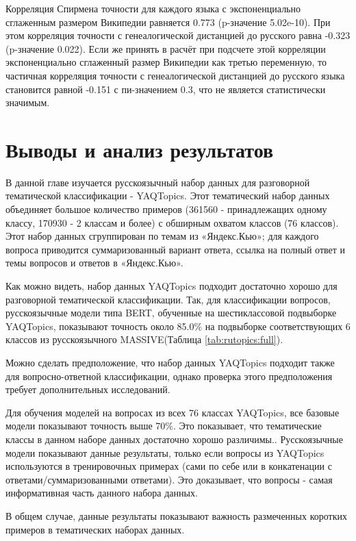 Корреляция Спирмена точности для каждого языка с экспоненциально сглаженным размером Википедии равняется 0.773 (p-значение 5.02e-10). При этом корреляция точности с генеалогической дистанцией до русского равна -0.323 (p-значение 0.022). Если же принять в расчёт при подсчете этой корреляции экспоненциально сглаженный размер Википедии как третью переменную, то частичная корреляция точности с генеалогической дистанцией до русского языка становится равной -0.151 с пи-значением 0.3, что не является статистически значимым.


\section{Выводы и анализ результатов} 

В данной главе изучается русскоязычный набор данных для разговорной тематической классификации - {YAQTopics}. Этот тематический набор данных объединяет большое количество примеров (361560 - принадлежащих одному классу, 170930 - 2 классам и более) с обширным охватом классов (76 классов). Этот набор данных сгруппирован по темам из «Яндекс.Кью»; для каждого вопроса приводится суммаризованный вариант ответа, ссылка на полный ответ и темы вопросов и ответов в «Яндекс.Кью».

Как можно видеть, набор данных {YAQTopics} подходит достаточно хорошо для разговорной тематической классификации. Так, для классификации вопросов, русскоязычные модели типа BERT, обученные на шестиклассовой подвыборке {YAQTopics}, показывают точность около 85.0\% на подвыборке соответствующих 6 классов из русскоязычного {MASSIVE}(Таблица \ref{tab:rutopics:full}).

Можно сделать предположение, что набор данных {YAQTopics} подходит также для вопросно-ответной классификации, однако проверка этого предположения требует дополнительных исследований.

Для обучения моделей на вопросах из всех 76 классах {YAQTopics}, все базовые модели показывают точность выше 70\%. Это показывает, что тематические классы в данном наборе данных достаточно хорошо различимы..
Русскоязычные модели показывают данные результаты, только если вопросы из  {YAQTopics} используются в тренировочных примерах (сами по себе или в конкатенации с ответами/суммаризованными ответами). Это доказывает, что вопросы - самая информативная часть данного набора данных.

В общем случае, данные результаты показывают важность размеченных коротких примеров в тематических наборах данных. 

